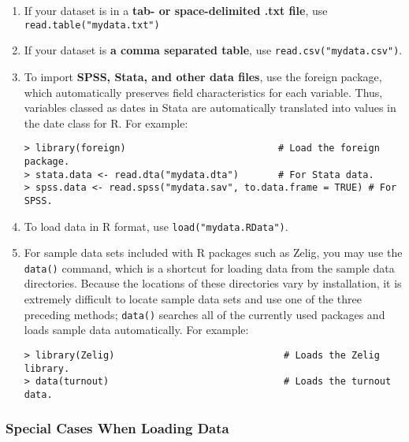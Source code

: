 \documentclass{article}
\begin{document}
\begin{enumerate}
\item If your dataset is in a \textbf{tab- or space-delimited .txt
    file}, use \texttt{read.table("mydata.txt")}
\item If your dataset is \textbf{a comma separated table}, use
  \texttt{read.csv("mydata.csv")}.
\item To import {\bf SPSS, Stata, and other data files}, use the
  foreign package, which automatically preserves field characteristics
  for each variable.  Thus, variables classed as dates in Stata are
  automatically translated into values in the date class for R.  For
  example:
\begin{verbatim}
> library(foreign)                           # Load the foreign package.  
> stata.data <- read.dta("mydata.dta")       # For Stata data.
> spss.data <- read.spss("mydata.sav", to.data.frame = TRUE) # For SPSS.
\end{verbatim}
\item To load data in R format, use {\tt load("mydata.RData")}.  
\item For sample data sets included with R packages such as Zelig, you
  may use the {\tt data()} command, which is a shortcut for loading
  data from the sample data directories.  Because the locations of
  these directories vary by installation, it is extremely difficult to
  locate sample data sets and use one of the three preceding methods;
  {\tt data()} searches all of the currently used packages and loads
  sample data automatically.  For example:
\begin{verbatim}
> library(Zelig)                              # Loads the Zelig library. 
> data(turnout)                               # Loads the turnout data.
\end{verbatim}
\end{enumerate}

\subsubsection*{Special Cases When Loading Data}
\end{document}
